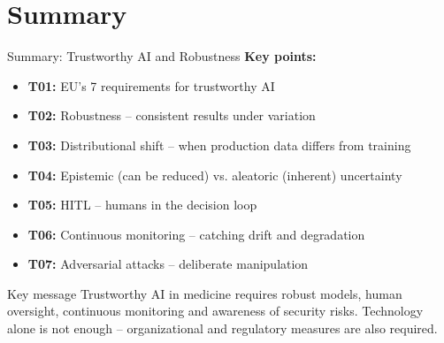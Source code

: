 \documentclass[aspectratio=169, 10pt]{beamer}
\begin{document}
\section*{Summary}

\begin{frame}{Summary: Trustworthy AI and Robustness}
    \textbf{Key points:}
    \begin{itemize}
        \item \textbf{T01:} EU's 7 requirements for trustworthy AI
        \item \textbf{T02:} Robustness -- consistent results under variation
        \item \textbf{T03:} Distributional shift -- when production data differs from training
        \item \textbf{T04:} Epistemic (can be reduced) vs. aleatoric (inherent) uncertainty
        \item \textbf{T05:} HITL -- humans in the decision loop
        \item \textbf{T06:} Continuous monitoring -- catching drift and degradation
        \item \textbf{T07:} Adversarial attacks -- deliberate manipulation
    \end{itemize}
    
    \vspace{0.3cm}
    \begin{block}{Key message}
        Trustworthy AI in medicine requires robust models, human oversight, continuous monitoring and awareness of security risks. Technology alone is not enough -- organizational and regulatory measures are also required.
    \end{block}
\end{frame}
\end{document}
